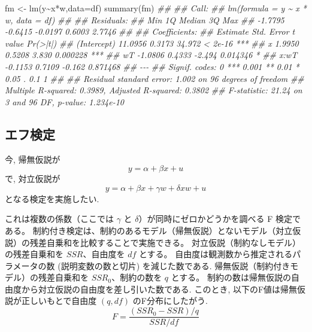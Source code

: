 \documentclass[
  letterpaper,
  xelatex,
  ja=standard, xelatex]{bxjsbook}
\newenvironment{Shaded}{\begin{snugshade}}{\end{snugshade}}
\newcommand{\AttributeTok}[1]{\textcolor[rgb]{0.40,0.45,0.13}{#1}}
\newcommand{\DocumentationTok}[1]{\textcolor[rgb]{0.37,0.37,0.37}{\textit{#1}}}
\newcommand{\FunctionTok}[1]{\textcolor[rgb]{0.28,0.35,0.67}{#1}}
\newcommand{\NormalTok}[1]{\textcolor[rgb]{0.00,0.23,0.31}{#1}}
\newcommand{\OtherTok}[1]{\textcolor[rgb]{0.00,0.23,0.31}{#1}}
\newcommand{\SpecialCharTok}[1]{\textcolor[rgb]{0.37,0.37,0.37}{#1}}
\begin{document}
\begin{Shaded}
\begin{Highlighting}[]
\NormalTok{fm }\OtherTok{\textless{}{-}} \FunctionTok{lm}\NormalTok{(y}\SpecialCharTok{\textasciitilde{}}\NormalTok{x}\SpecialCharTok{*}\NormalTok{w,}\AttributeTok{data=}\NormalTok{df)}
\FunctionTok{summary}\NormalTok{(fm)}
\DocumentationTok{\#\# }
\DocumentationTok{\#\# Call:}
\DocumentationTok{\#\# lm(formula = y \textasciitilde{} x * w, data = df)}
\DocumentationTok{\#\# }
\DocumentationTok{\#\# Residuals:}
\DocumentationTok{\#\#     Min      1Q  Median      3Q     Max }
\DocumentationTok{\#\# {-}1.7795 {-}0.6415 {-}0.0197  0.6003  2.7746 }
\DocumentationTok{\#\# }
\DocumentationTok{\#\# Coefficients:}
\DocumentationTok{\#\#             Estimate Std. Error t value Pr(\textgreater{}|t|)    }
\DocumentationTok{\#\# (Intercept)  11.0956     0.3173  34.972  \textless{} 2e{-}16 ***}
\DocumentationTok{\#\# x             1.9950     0.5208   3.830 0.000228 ***}
\DocumentationTok{\#\# wT           {-}1.0806     0.4333  {-}2.494 0.014346 *  }
\DocumentationTok{\#\# x:wT         {-}0.1153     0.7109  {-}0.162 0.871468    }
\DocumentationTok{\#\# {-}{-}{-}}
\DocumentationTok{\#\# Signif. codes:  0 \textquotesingle{}***\textquotesingle{} 0.001 \textquotesingle{}**\textquotesingle{} 0.01 \textquotesingle{}*\textquotesingle{} 0.05 \textquotesingle{}.\textquotesingle{} 0.1 \textquotesingle{} \textquotesingle{} 1}
\DocumentationTok{\#\# }
\DocumentationTok{\#\# Residual standard error: 1.002 on 96 degrees of freedom}
\DocumentationTok{\#\# Multiple R{-}squared:  0.3989, Adjusted R{-}squared:  0.3802 }
\DocumentationTok{\#\# F{-}statistic: 21.24 on 3 and 96 DF,  p{-}value: 1.234e{-}10}
\end{Highlighting}
\end{Shaded}

\subsection{エフ検定}\label{ux30a8ux30d5ux691cux5b9a}

今, 帰無仮説が \[
y = \alpha + \beta x + u
\] で, 対立仮説が \[
y = \alpha + \beta x + \gamma w + \delta xw + u
\] となる検定を実施したい.

これは複数の係数（ここでは \(\gamma\) と
\(\delta\)）が同時にゼロかどうかを調べる F 検定である。
制約付き検定は、制約のあるモデル（帰無仮説）とないモデル（対立仮説）の残差自乗和を比較することで実施できる。
対立仮説（制約なしモデル）の残差自乗和を \(SSR\)、自由度を \(df\)
とする。 自由度は観測数から推定されるパラメータの数 (説明変数の数と切片)
を減じた数である. 帰無仮説（制約付きモデル）の残差自乗和を
\(SSR_0\)、制約の数を \(q\) とする。
制約の数は帰無仮説の自由度から対立仮説の自由度を差し引いた数である.
このとき, 以下のF値は帰無仮説が正しいもとで自由度 \((q, df)\)
のF分布にしたがう. \[
F = \frac{(SSR_0-SSR)/q}{SSR/df}
\]
\end{document}
